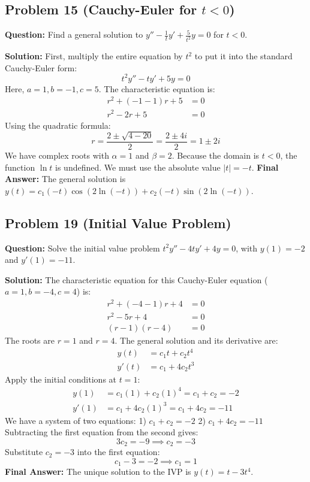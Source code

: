 \documentclass{article}
\begin{document}
\subsection{Problem 15 (Cauchy-Euler for $t < 0$)}
\textbf{Question:} Find a general solution to $y'' - \frac{1}{t}y' + \frac{5}{t^2}y = 0$ for $t < 0$.

\textbf{Solution:}
First, multiply the entire equation by $t^2$ to put it into the standard Cauchy-Euler form:
\[ t^2 y'' - ty' + 5y = 0 \]
Here, $a=1, b=-1, c=5$. The characteristic equation is:
\begin{align*}
r^2 + (-1 - 1)r + 5 &= 0 \\
r^2 - 2r + 5 &= 0
\end{align*}
Using the quadratic formula:
\[ r = \frac{2 \pm \sqrt{4 - 20}}{2} = \frac{2 \pm 4i}{2} = 1 \pm 2i \]
We have complex roots with $\alpha = 1$ and $\beta = 2$.
Because the domain is $t < 0$, the function $\ln t$ is undefined. We must use the absolute value $|t| = -t$.
\textbf{Final Answer:} The general solution is $y(t) = c_1 (-t) \cos(2 \ln(-t)) + c_2 (-t) \sin(2 \ln(-t))$.

\subsection{Problem 19 (Initial Value Problem)}
\textbf{Question:} Solve the initial value problem $t^2 y'' - 4ty' + 4y = 0$, with $y(1) = -2$ and $y'(1) = -11$.

\textbf{Solution:}
The characteristic equation for this Cauchy-Euler equation ($a=1, b=-4, c=4$) is:
\begin{align*}
r^2 + (-4 - 1)r + 4 &= 0 \\
r^2 - 5r + 4 &= 0 \\
(r-1)(r-4) &= 0
\end{align*}
The roots are $r = 1$ and $r = 4$. The general solution and its derivative are:
\begin{align*}
y(t) &= c_1 t + c_2 t^4 \\
y'(t) &= c_1 + 4c_2 t^3
\end{align*}
Apply the initial conditions at $t=1$:
\begin{align*}
y(1) &= c_1(1) + c_2(1)^4 = c_1 + c_2 = -2 \\
y'(1) &= c_1 + 4c_2(1)^3 = c_1 + 4c_2 = -11
\end{align*}
We have a system of two equations:
1) $c_1 + c_2 = -2$
2) $c_1 + 4c_2 = -11$
Subtracting the first equation from the second gives:
\[ 3c_2 = -9 \implies c_2 = -3 \]
Substitute $c_2 = -3$ into the first equation:
\[ c_1 - 3 = -2 \implies c_1 = 1 \]
\textbf{Final Answer:} The unique solution to the IVP is $y(t) = t - 3t^4$.
\end{document}
